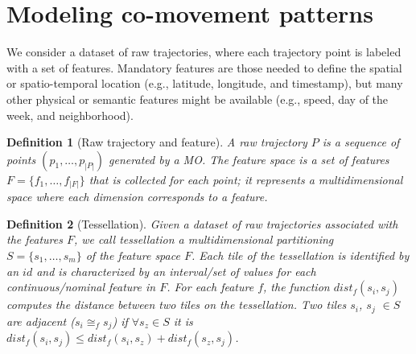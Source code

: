 \documentclass[
]{ceurart}
\newtheorem{definition}{Definition}
\begin{document}
\section{Modeling co-movement patterns}\label{sec:modeling}
We consider a dataset of raw trajectories, where each trajectory point is labeled with a set of features.
Mandatory features are those needed to define the spatial or spatio-temporal location (e.g., latitude, longitude, and timestamp), but many other physical or semantic features might be available (e.g., speed, day of the week, and neighborhood).

\begin{definition}[Raw trajectory and feature] 
A \textit{raw trajectory} $P$ is a sequence of points $(p_1, \ldots, p_{|P|})$ generated by a MO. 
The \textit{feature space} is a set of features $F=\{f_1,\ldots,f_{|F|}\}$ that is collected for each point; it represents a multidimensional space where each dimension corresponds to a feature.
\end{definition}

\begin{definition}[Tessellation] 
Given a dataset of raw trajectories associated with the features $F$, we call \textit{tessellation} a multidimensional partitioning $S = \{s_1, \ldots, s_m\}$ of the feature space $F$.
Each \textit{tile} of the tessellation is identified by an $id$ and is characterized by an interval/set of values for each continuous/nominal feature in $F$.
For each feature $f$, the function $dist_f(s_i, s_j)$ computes the distance between two tiles on the tessellation.
Two tiles $s_i$, $s_j$ $\in S$ are  \textit{adjacent} ($s_i \cong_{f} s_j$) if $\forall s_z \in S$ it is $dist_f(s_i,s_j)\leq dist_f(s_i,s_z) + dist_f(s_z,s_j)$.
\end{definition}
\end{document}
